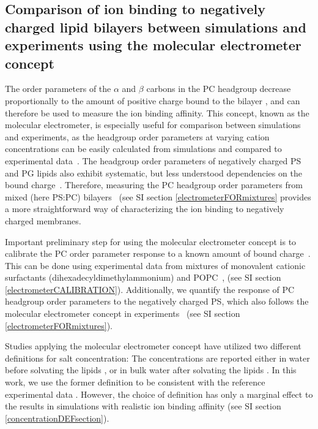 \documentclass[aps,prl,superscriptaddress,twocolumn]{revtex4}
\begin{document}
\subsection{Comparison of ion binding to negatively charged lipid bilayers 
between simulations and experiments using the molecular electrometer concept}

The order parameters of the $\alpha$ and $\beta$ carbons in the PC headgroup
decrease proportionally to the amount of positive
charge bound to the bilayer \cite{akutsu81,altenbach84,seelig87},
and can therefore be used to measure the ion binding affinity.
This concept, known as the molecular electrometer, is especially useful for 
comparison between simulations and experiments, as
the headgroup order parameters at varying cation
concentrations can be easily calculated from
simulations and compared to experimental data~\cite{catte16}. The headgroup order parameters
of negatively charged PS and PG lipids also exhibit systematic, but less
understood dependencies on the bound charge~\cite{borle85,macdonald87,roux86,roux90}.
Therefore, measuring the PC headgroup order parameters from 
mixed (here PS:PC) bilayers~\cite{roux86,roux90,roux91} (see SI section \ref{electrometerFORmixtures} provides a more straightforward way of characterizing the ion binding to negatively charged membranes.

Important preliminary step for using the molecular electrometer concept is to calibrate the PC order parameter response to a known amount of bound charge~\cite{catte16,melcr18}.
This can be done using experimental data from mixtures of
monovalent cationic surfactants (dihexadecyldimethylammonium) and POPC~\cite{scherer89,melcr18},
(see SI section \ref{electrometerCALIBRATION}). Additionally, we quantify the response of PC headgroup order parameters
to the negatively charged PS, which also follows the molecular electrometer
concept in experiments~\cite{scherer87} (see SI section \ref{electrometerFORmixtures}).

Studies applying the molecular electrometer concept have utilized two different definitions for salt concentration:
The concentrations are reported either in water before solvating the lipids \cite{akutsu81,roux90,catte16},
or in bulk water after solvating the lipids \cite{altenbach84,melcr18}.
In this work, we use the former definition to be consistent with the reference
experimental data \cite{roux90}. However, the choice of definition has only a marginal effect
to the results in simulations with realistic ion binding affinity
(see SI section \ref{concentrationDEFsection}).
\end{document}
